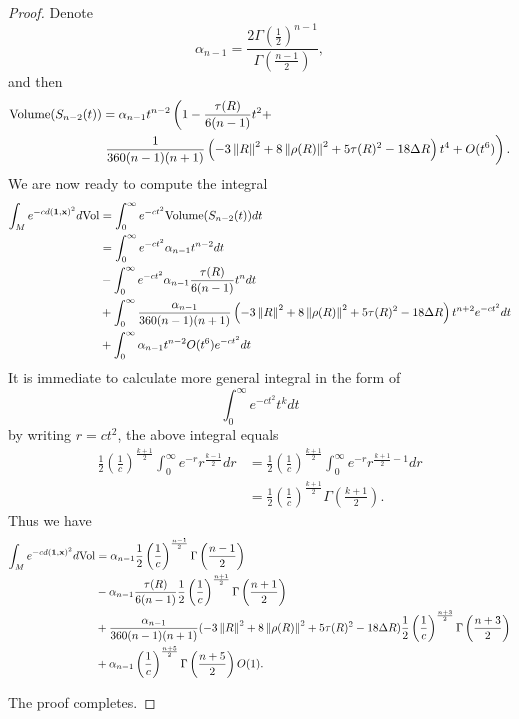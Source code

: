 \begin{proof}
Denote
\[
\alpha_{n-1}=\frac{2\Gamma(\frac{1}{2})^{n-1}}{\Gamma(\frac{n-1}{2})},
\]
and then
\begin{equation}
\begin{split}
\text{Volume}(S_{n-2}(t))&=\alpha_{n-1}t^{n-2}\left(1-\frac{\tau(R)}{6(n-1)}t^2+\right.
\\
&\left.\frac{1}{360(n-1)(n+1)}\left(-3\left\Vert R \right\Vert^2+8\left\Vert \rho(R) \right\Vert^2+5\tau(R)^2-18\Delta R\right)t^4+O(t^6)\right).
\end{split}
\end{equation}
We are now ready to compute the integral
\begin{equation}
\begin{split}
\int_Me^{-cd(\mathbf{1},\mathbf{x})^2}d\mathrm{Vol}&=\int_0^{\infty}e^{-ct^2}\text{Volume}(S_{n-2}(t))dt
\\
&=\int_0^{\infty}e^{-ct^2}\alpha_{n-1}t^{n-2}dt
\\
&-\int_0^{\infty}e^{-ct^2}\alpha_{n-1}\frac{\tau(R)}{6(n-1)}t^ndt
\\
&+\int_0^{\infty}\frac{\alpha_{n-1}}{360(n-1)(n+1)}\left(-3\left\Vert R \right\Vert^2+8\left\Vert \rho(R) \right\Vert^2+5\tau(R)^2-18\Delta R\right)t^{n+2}e^{-ct^2}dt
\\
&+\int_0^{\infty}\alpha_{n-1}t^{n-2}O(t^6)e^{-ct^2}dt
\end{split}
\end{equation}
It is immediate to calculate more general integral in the form of 
\[
\int_0^{\infty}e^{-ct^2}t^kdt
\]
by writing $r=ct^2$, the above integral equals
\begin{equation}
\begin{split}
\frac{1}{2}\left(\frac{1}{c}\right)^{\frac{k+1}{2}}\int_0^{\infty}e^{-r}r^{\frac{k-1}{2}}dr&=\frac{1}{2}\left(\frac{1}{c}\right)^{\frac{k+1}{2}}\int_0^{\infty}e^{-r}r^{\frac{k+1}{2}-1}dr
\\
&=\frac{1}{2}\left(\frac{1}{c}\right)^{\frac{k+1}{2}}\Gamma\left(\frac{k+1}{2}\right).
\end{split}
\end{equation}
Thus we have
\begin{equation}
\begin{split}
\int_Me^{-cd(\mathbf{1},\mathbf{x})^2}d\mathrm{Vol}&=\alpha_{n-1}\frac{1}{2}\left(\frac{1}{c}\right)^{\frac{n-1}{2}}\Gamma\left(\frac{n-1}{2}\right)
\\
&-\alpha_{n-1}\frac{\tau(R)}{6(n-1)}\frac{1}{2}\left(\frac{1}{c}\right)^{\frac{n+1}{2}}\Gamma\left(\frac{n+1}{2}\right)
\\
&+\frac{\alpha_{n-1}}{360(n-1)(n+1)}(-3\left\Vert R \right\Vert^2+8\left\Vert \rho(R) \right\Vert^2+5\tau(R)^2-18\Delta R)\frac{1}{2}\left(\frac{1}{c}\right)^{\frac{n+3}{2}}\Gamma\left(\frac{n+3}{2}\right)
\\
&+\alpha_{n-1}\left(\frac{1}{c}\right)^{\frac{n+5}{2}}\Gamma\left(\frac{n+5}{2}\right)O(1).
\end{split}
\end{equation}


The proof completes.

\end{proof}



